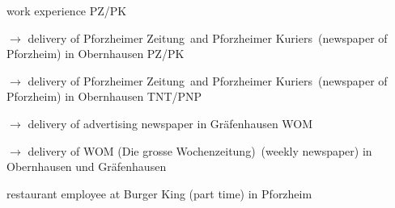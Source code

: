 \begin{rubric}{\textcolor{black!20!blue!100}{work experience}}
		\entry*[08/2015 --- 09/2015]
			PZ/PK
			
			\setlength{\hangindent}{\widthof{$\rightarrow$ }}
			$\rightarrow$ delivery of \glqq Pforzheimer Zeitung\grqq\ and \glqq Pforzheimer Kuriers\grqq\ (newspaper of Pforzheim) in Obernhausen
		\entry*[08/2012 --- 09/2012]
			PZ/PK
			
			\setlength{\hangindent}{\widthof{$\rightarrow$ }}
			$\rightarrow$ delivery of \glqq Pforzheimer Zeitung\grqq\ and \glqq Pforzheimer Kuriers\grqq\ (newspaper of Pforzheim) in Obernhausen
		\entry*[06/2009 --- 10/2010]
			TNT/PNP
			
			\setlength{\hangindent}{\widthof{$\rightarrow$ }}
			$\rightarrow$ delivery of advertising newspaper in Gräfenhausen
		\entry*[06/2007 --- 12/2008]
			WOM
			
			\setlength{\hangindent}{\widthof{$\rightarrow$ }}
			$\rightarrow$ delivery of \glqq WOM (Die grosse Wochenzeitung)\grqq\ (weekly newspaper) in Obernhausen und Gräfenhausen
			
		\entry*[04/2012 --- 10/2012]
			restaurant employee at Burger King (part time) in Pforzheim
\end{rubric}
\versionLanguageEnd